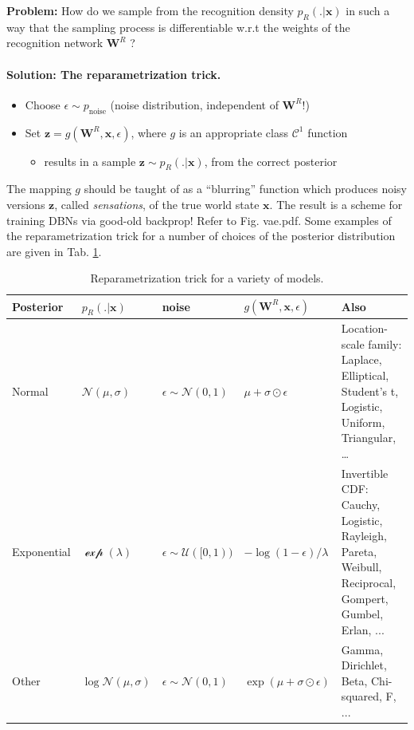 \documentclass[10pt,letterpaper]{article}
\def\z{\mathbf{z}}
\def\W{\mathbf{W}}
\def\x{\mathbf{x}}
\begin{document}
\begin{mdframed}
  \textbf{Problem:} How do we sample from the recognition density $p_R(.|\x)$ in such a way that the sampling process is differentiable w.r.t the weights of the recognition network $\W^R$ ?
\end{mdframed}


\paragraph{Solution: The reparametrization trick.}
\begin{itemize}
\item Choose $\epsilon \sim p_{\text{noise}}$ (noise distribution, independent of $\W^R$!)
\item Set $\z = g(\W^{R}, \x, \epsilon)$, where $g$ is an appropriate class $\mathcal C^1$ function
  \begin{itemize}
  \item results in a sample $\z \sim p_R(.|\x)$, from the correct
    posterior
    \end{itemize}
\end{itemize}
The mapping $g$ should be taught of as a ``blurring'' function which produces noisy versions $\z$,
called \textit{sensations}, of the true world state $\x$.
The result is a scheme for training DBNs via good-old backprop!
Refer to Fig. vae.pdf.
Some examples of the reparametrization trick for a number of
choices of the posterior distribution are given in Tab. \ref{tab:rptrick}.

\begin{table}[H]
  \begin{tabular}{p{1.7cm}|p{1.5cm}|p{1.9cm}|p{2.1cm}|p{5cm}}
         \hline
         Posterior & $p_R(.|\x)$ & noise & $g(\W^R,\x,\epsilon)$ & Also \\ \hline
         Normal & $\mathcal N(\mu,\sigma)$ & $\epsilon \sim \mathcal N(0, 1)$ & $\mu + \sigma \odot \epsilon$ & Location-scale family: Laplace, Elliptical,
         Student’s t, Logistic, Uniform, Triangular, \ldots \\ \hline
         Exponential & $\mathcal \exp(\lambda)$ & $\epsilon \sim \mathcal U([0, 1))$ & $-\log(1-\epsilon)/\lambda$ & Invertible CDF: Cauchy, Logistic, Rayleigh, Pareta, Weibull, Reciprocal, Gompert, Gumbel, Erlan, ... \\ \hline
         Other & $\log\mathcal N(\mu,\sigma)$ & $\epsilon \sim \mathcal N(0, 1)$ & $\exp(\mu + \sigma \odot \epsilon)$ & Gamma, Dirichlet, Beta, Chi-squared, F, ... \\ \hline
  \end{tabular}
  \caption{Reparametrization trick \citep{kingma2013auto} for a variety of models.}
  \label{tab:rptrick}
\end{table}
\end{document}
